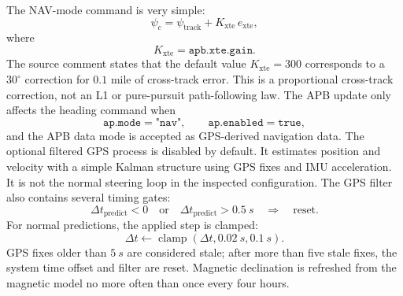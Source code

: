\documentclass[10pt,twocolumn]{article}
\begin{document}
The NAV-mode command is very simple:
\[
\psi_c
=
\psi_{\mathrm{track}}
+
K_{\mathrm{xte}}\,e_{\mathrm{xte}},
\]
where
\[
K_{\mathrm{xte}} = \texttt{apb.xte.gain}.
\]
The source comment states that the default value \(K_{\mathrm{xte}}=300\)
corresponds to a \(30^\circ\) correction for \(0.1\) mile of cross-track
error.  This is a proportional cross-track correction, not an L1 or
pure-pursuit path-following law.
The APB update only affects the heading command when
\[
\texttt{ap.mode}=\texttt{"nav"},
\qquad
\texttt{ap.enabled}=\texttt{true},
\]
and the APB data mode is accepted as GPS-derived navigation data.
The optional filtered GPS process is disabled by default.  It estimates
position and velocity with a simple Kalman structure using GPS fixes and
IMU acceleration.  It is not the normal steering loop in the inspected
configuration.
The GPS filter also contains several timing gates:
\[
\Delta t_{\mathrm{predict}} < 0
\quad\text{or}\quad
\Delta t_{\mathrm{predict}} > \SI{0.5}{s}
\quad\Longrightarrow\quad
\text{reset}.
\]
For normal predictions, the applied step is clamped:
\[
\Delta t
\leftarrow
\operatorname{clamp}(\Delta t,\SI{0.02}{s},\SI{0.1}{s}).
\]
GPS fixes older than \(\SI{5}{s}\) are considered stale; after more than
five stale fixes, the system time offset and filter are reset.  Magnetic
declination is refreshed from the magnetic model no more often than once
every four hours.
\end{document}
